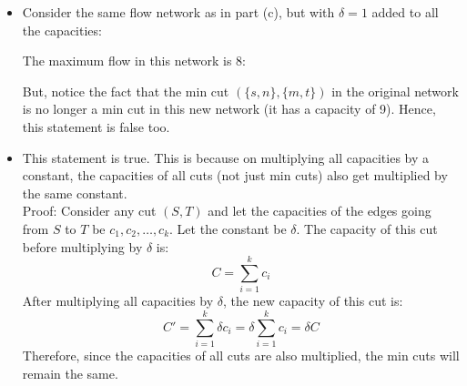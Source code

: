 \documentclass{article}
\begin{document}
\begin{itemize}
    \item[(d)] Consider the same flow network as in part (c), but with $\delta = 1$ added to all the capacities:
    \begin{center}
    \end{center}
    The maximum flow in this network is 8:
    \begin{center}
    \end{center}
    But, notice the fact that the min cut $(\{s, n\}, \{m, t\})$ in the original network is no longer a min cut in this new network (it has a capacity of 9).
    Hence, this statement is false too.

    \item[(e)] This statement is true.
    This is because on multiplying all capacities by a constant, the capacities of all cuts (not just min cuts) also get multiplied by the same constant. \\
    Proof: Consider any cut $(S, T)$ and let the capacities of the edges going from $S$ to $T$ be $c_1, c_2, \ldots, c_k$.
    Let the constant be $\delta$.
    The capacity of this cut before multiplying by $\delta$ is:
    \[ C = \sum_{i=1}^{k} c_i \]
    After multiplying all capacities by $\delta$, the new capacity of this cut is:
    \[ C' = \sum_{i=1}^{k} \delta c_i = \delta \sum_{i=1}^{k} c_i = \delta C \]
    Therefore, since the capacities of all cuts are also multiplied, the min cuts will remain the same.
  \end{itemize}
\end{document}
